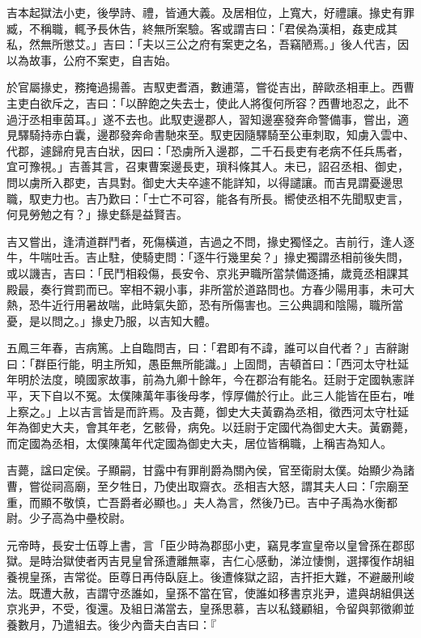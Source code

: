 \begin{pinyinscope}
吉本起獄法小吏，後學詩、禮，皆通大義。及居相位，上寬大，好禮讓。掾史有罪臧，不稱職，輒予長休告，終無所案驗。客或謂吉曰：「君侯為漢相，姦吏成其私，然無所懲艾。」吉曰：「夫以三公之府有案吏之名，吾竊陋焉。」後人代吉，因以為故事，公府不案吏，自吉始。

於官屬掾史，務掩過揚善。吉馭吏耆酒，數逋蕩，嘗從吉出，醉歐丞相車上。西曹主吏白欲斥之，吉曰：「以醉飽之失去士，使此人將復何所容？西曹地忍之，此不過汙丞相車茵耳。」遂不去也。此馭吏邊郡人，習知邊塞發奔命警備事，嘗出，適見驛騎持赤白囊，邊郡發奔命書馳來至。馭吏因隨驛騎至公車刺取，知虜入雲中、代郡，遽歸府見吉白狀，因曰：「恐虜所入邊郡，二千石長吏有老病不任兵馬者，宜可豫視。」吉善其言，召東曹案邊長吏，瑣科條其人。未已，詔召丞相、御史，問以虜所入郡吏，吉具對。御史大夫卒遽不能詳知，以得譴讓。而吉見謂憂邊思職，馭吏力也。吉乃歎曰：「士亡不可容，能各有所長。嚮使丞相不先聞馭吏言，何見勞勉之有？」掾史繇是益賢吉。

吉又嘗出，逢清道群鬥者，死傷橫道，吉過之不問，掾史獨怪之。吉前行，逢人逐牛，牛喘吐舌。吉止駐，使騎吏問：「逐牛行幾里矣？」掾史獨謂丞相前後失問，或以譏吉，吉曰：「民鬥相殺傷，長安令、京兆尹職所當禁備逐捕，歲竟丞相課其殿最，奏行賞罰而已。宰相不親小事，非所當於道路問也。方春少陽用事，未可大熱，恐牛近行用暑故喘，此時氣失節，恐有所傷害也。三公典調和陰陽，職所當憂，是以問之。」掾史乃服，以吉知大體。

五鳳三年春，吉病篤。上自臨問吉，曰：「君即有不諱，誰可以自代者？」吉辭謝曰：「群臣行能，明主所知，愚臣無所能識。」上固問，吉頓首曰：「西河太守杜延年明於法度，曉國家故事，前為九卿十餘年，今在郡治有能名。廷尉于定國執憲詳平，天下自以不冤。太僕陳萬年事後母孝，惇厚備於行止。此三人能皆在臣右，唯上察之。」上以吉言皆是而許焉。及吉薨，御史大夫黃霸為丞相，徵西河太守杜延年為御史大夫，會其年老，乞骸骨，病免。以廷尉于定國代為御史大夫。黃霸薨，而定國為丞相，太僕陳萬年代定國為御史大夫，居位皆稱職，上稱吉為知人。

吉薨，諡曰定侯。子顯嗣，甘露中有罪削爵為關內侯，官至衛尉太僕。始顯少為諸曹，嘗從祠高廟，至夕牲日，乃使出取齋衣。丞相吉大怒，謂其夫人曰：「宗廟至重，而顯不敬慎，亡吾爵者必顯也。」夫人為言，然後乃已。吉中子禹為水衡都尉。少子高為中壘校尉。

元帝時，長安士伍尊上書，言「臣少時為郡邸小吏，竊見孝宣皇帝以皇曾孫在郡邸獄。是時治獄使者丙吉見皇曾孫遭離無辜，吉仁心感動，涕泣悽惻，選擇復作胡組養視皇孫，吉常從。臣尊日再侍臥庭上。後遭條獄之詔，吉扞拒大難，不避嚴刑峻法。既遭大赦，吉謂守丞誰如，皇孫不當在官，使誰如移書京兆尹，遣與胡組俱送京兆尹，不受，復還。及組日滿當去，皇孫思慕，吉以私錢顧組，令留與郭徵卿並養數月，乃遣組去。後少內嗇夫白吉曰：『


\end{pinyinscope}
